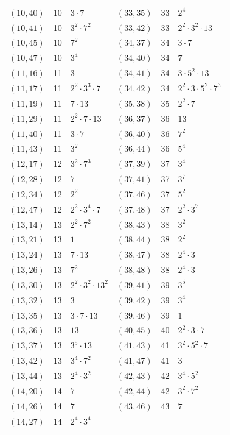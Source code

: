 \documentclass[11pt]{article}
\begin{document}
\begin{longtable}{@{}lrl@{\qquad}lrl@{}}
$(10,40)$ & 10 & $3\cdot 7$ & $(33,35)$ & 33 & $2^{4}$\\
$(10,41)$ & 10 & $3^{2}\cdot 7^{2}$ & $(33,42)$ & 33 & $2^{2}\cdot 3^{2}\cdot 13$\\
$(10,45)$ & 10 & $7^{2}$ & $(34,37)$ & 34 & $3\cdot 7$\\
$(10,47)$ & 10 & $3^{4}$ & $(34,40)$ & 34 & $7$\\
$(11,16)$ & 11 & $3$ & $(34,41)$ & 34 & $3\cdot 5^{2}\cdot 13$\\
$(11,17)$ & 11 & $2^{2}\cdot 3^{3}\cdot 7$ & $(34,42)$ & 34 & $2^{2}\cdot 3\cdot 5^{2}\cdot 7^{3}$\\
$(11,19)$ & 11 & $7\cdot 13$ & $(35,38)$ & 35 & $2^{2}\cdot 7$\\
$(11,29)$ & 11 & $2^{2}\cdot 7\cdot 13$ & $(36,37)$ & 36 & $13$\\
$(11,40)$ & 11 & $3\cdot 7$ & $(36,40)$ & 36 & $7^{2}$\\
$(11,43)$ & 11 & $3^{2}$ & $(36,44)$ & 36 & $5^{4}$\\
$(12,17)$ & 12 & $3^{2}\cdot 7^{3}$ & $(37,39)$ & 37 & $3^{4}$\\
$(12,28)$ & 12 & $7$ & $(37,41)$ & 37 & $3^{7}$\\
$(12,34)$ & 12 & $2^{2}$ & $(37,46)$ & 37 & $5^{2}$\\
$(12,47)$ & 12 & $2^{2}\cdot 3^{4}\cdot 7$ & $(37,48)$ & 37 & $2^{2}\cdot 3^{7}$\\
$(13,14)$ & 13 & $2^{2}\cdot 7^{2}$ & $(38,43)$ & 38 & $3^{2}$\\
$(13,21)$ & 13 & $1$ & $(38,44)$ & 38 & $2^{2}$\\
$(13,24)$ & 13 & $7\cdot 13$ & $(38,47)$ & 38 & $2^{4}\cdot 3$\\
$(13,26)$ & 13 & $7^{2}$ & $(38,48)$ & 38 & $2^{4}\cdot 3$\\
$(13,30)$ & 13 & $2^{2}\cdot 3^{2}\cdot 13^{2}$ & $(39,41)$ & 39 & $3^{5}$\\
$(13,32)$ & 13 & $3$ & $(39,42)$ & 39 & $3^{4}$\\
$(13,35)$ & 13 & $3\cdot 7\cdot 13$ & $(39,46)$ & 39 & $1$\\
$(13,36)$ & 13 & $13$ & $(40,45)$ & 40 & $2^{2}\cdot 3\cdot 7$\\
$(13,37)$ & 13 & $3^{5}\cdot 13$ & $(41,43)$ & 41 & $3^{2}\cdot 5^{2}\cdot 7$\\
$(13,42)$ & 13 & $3^{4}\cdot 7^{2}$ & $(41,47)$ & 41 & $3$\\
$(13,44)$ & 13 & $2^{4}\cdot 3^{2}$ & $(42,43)$ & 42 & $3^{4}\cdot 5^{2}$\\
$(14,20)$ & 14 & $7$ & $(42,44)$ & 42 & $3^{2}\cdot 7^{2}$\\
$(14,26)$ & 14 & $7$ & $(43,46)$ & 43 & $7$\\
$(14,27)$ & 14 & $2^{4}\cdot 3^{4}$ & & &\\
\end{longtable}
\endgroup
\end{document}
